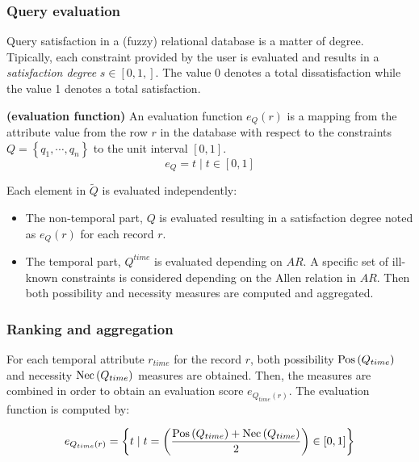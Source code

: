 \subsubsection{Query evaluation}
\label{subsubsec:query-evaluation}
Query satisfaction in a (fuzzy) relational database is a matter of degree. Tipically, each constraint provided by the user is evaluated and results in a \emph{satisfaction degree} $s \in \left[ 0,1,\right]$. The value 0 denotes a total dissatisfaction while the value 1 denotes a total satisfaction.

\begin{definition}
\label{def:evaluation-function}
\textbf{(evaluation function)}
An evaluation function $e_{Q} \left( r \right)$ is a mapping from the attribute value from the row $r$ in the database with respect to the constraints $Q = \left \lbrace q_1, \cdots, q_n \right \rbrace$ to the unit interval $\left[ 0,1 \right]$. 
\begin{equation}
\label{eq:evaluation-function} 
e_{Q} = t \mid t \in \left[ 0,1 \right]
\end{equation}
\end{definition}

Each element in $\tilde{Q}$ is evaluated independently:
\begin{itemize}
\item
The non-temporal part, $Q$ is evaluated resulting in a satisfaction degree noted as $e_Q(r)$ for each record $r$.
\item
The temporal part, $Q^{time}$ is evaluated depending on $AR$. A specific set of ill-known constraints is considered depending on the Allen relation in $AR$. Then both possibility and necessity measures are computed and aggregated.
\end{itemize}

\subsubsection{Ranking and aggregation}
For each temporal attribute $r_{time}$ for the record $r$, both possibility $\operatorname{Pos} \left( Q_{time}\right)$ and necessity $\operatorname{Nec} \left( Q_{time} \right)$ measures are obtained. Then, the measures are combined in order to obtain an evaluation score $e_{Q_{time} \left( r \right)}$. The evaluation function is computed by:

\begin{equation}
\label{eq:temporal-eval}
e_{Q_{time} \left( r \right)} = \left \lbrace t \mid t = \left( \frac{\Pos \left( Q_{time}\right) + \Nec \left( Q_{time} \right)}{2} \right)   \in \left[ 0,1\right] \right \rbrace
\end{equation}

